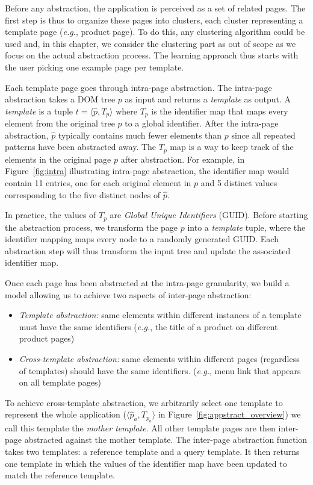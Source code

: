 Before any abstraction, the application is perceived as a set of related pages.
The first step is thus to organize these pages into clusters, each cluster representing a template page (\emph{e.g.}, product page).
To do this, any clustering algorithm could be used and, in this chapter, we consider the clustering part as out of scope as we focus on the actual abstraction process.
The learning approach thus starts with the user picking one example page per template.

Each template page goes through intra-page abstraction.
The intra-page abstraction takes a DOM tree $p$ as input and returns a \textit{template} as output.
A \textit{template} is a tuple $t = \langle \hat{p}, T_p \rangle$ where $T_p$ is the identifier map that maps every element from the original tree $p$ to a global identifier. After the intra-page abstraction, $\hat{p}$ typically contains much fewer elements than $p$ since all repeated patterns have been abstracted away.
The $T_p$ map is a way to keep track of the elements in the original page $p$ after abstraction.
For example, in Figure~\ref{fig:intra} illustrating intra-page abstraction, the identifier map would contain 11 entries, one for each original element in $p$ and 5 distinct values corresponding to the five distinct nodes of $\hat{p}$.

In practice, the values of $T_p$ are \emph{Global Unique Identifiers} (GUID).
Before starting the abstraction process, we transform the page $p$ into a \textit{template} tuple, where the identifier mapping maps every node to a randomly generated GUID.
Each abstraction step will thus transform the input tree and update the associated identifier map.

Once each page has been abstracted at the intra-page granularity, we build a model allowing us to achieve two aspects of inter-page abstraction:
\begin{itemize}
    \item \textit{Template abstraction:} same elements within different instances of a template must have the same identifiers (\emph{e.g.}, the title of a product on different product pages)
    \item \textit{Cross-template abstraction:} same elements within different pages (regardless of templates) should have the same identifiers. (\emph{e.g.}, menu link that appears on all template pages)
\end{itemize}

To achieve cross-template abstraction, we arbitrarily select one template to represent the whole application ($\langle \hat{p}_a, T_{p_a} \rangle$ in Figure~\ref{fig:appstract_overview}) we call this template the \textit{mother template}.
All other template pages are then inter-page abstracted against the mother template. 
The inter-page abstraction function takes two templates: a reference template and a query template. It then returns one template in which the values of the identifier map have been updated to match the reference template.


